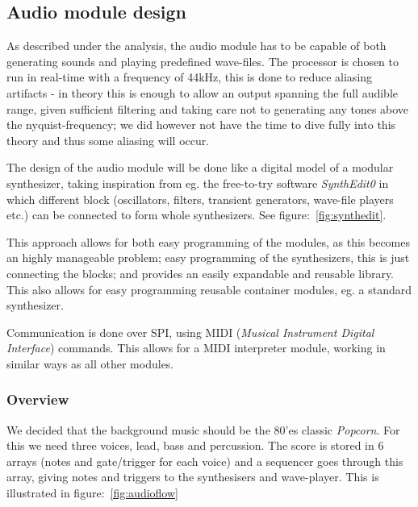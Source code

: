 \subsection{Audio module design}

As described under the analysis, the audio module has to be capable of both
generating sounds and playing predefined wave-files. The processor is chosen to
run in real-time with a frequency of 44kHz, this is done to reduce aliasing
artifacts - in theory this is enough to allow an output spanning the full
audible range, given sufficient filtering and taking care not to generating any
tones above the nyquist-frequency; we did however not have the time to dive
fully into this theory and thus some aliasing will occur.

The design of the audio module will be done like a digital model of a modular
synthesizer, taking inspiration from eg. the free-to-try software
\emph{SynthEdit0} in which different block (oscillators, filters, transient
generators, wave-file players etc.) can be connected to form whole synthesizers.
See figure:~\ref{fig:synthedit}.


This approach allows for both easy programming of the modules, as this becomes
an highly manageable problem; easy programming of the synthesizers, this is just
connecting the blocks; and provides an easily expandable and reusable library.
This also allows for easy programming reusable container modules, eg. a
standard synthesizer.

Communication is done over SPI, using MIDI (\emph{Musical Instrument Digital
Interface}) commands. This allows for a MIDI interpreter module, working in
similar ways as all other modules.

\subsubsection{Overview}
We decided that the background music should be the 80'es classic
\emph{Popcorn}.
For this we need three voices, lead, bass and percussion.
The score is stored in 6 arrays (notes and gate/trigger for each voice) and a
sequencer goes through this array, giving notes and triggers to the synthesisers
and wave-player. This is illustrated in figure:~\ref{fig:audioflow} 


